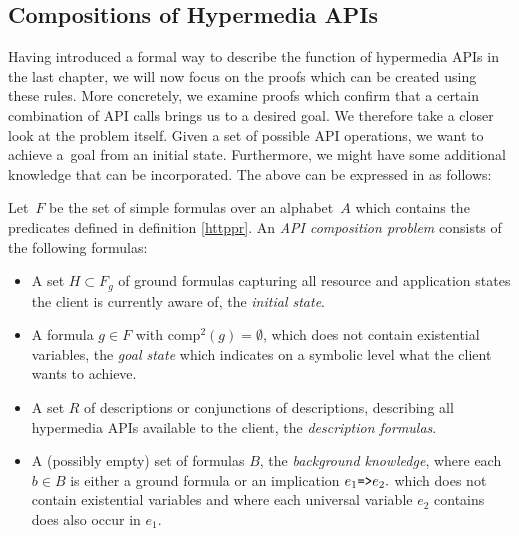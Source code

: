 \subsection{Compositions of Hypermedia APIs}
\label{subsec:Definition}
Having introduced a formal way to describe the function of hypermedia APIs in the last chapter,
we will now focus on the proofs which can be created using these rules.
More concretely, we examine proofs which confirm that a certain combination of API calls brings us to a desired goal.
We therefore take a closer look at the problem itself.
Given a set of possible API operations,
we want to achieve a~goal from an initial state.
Furthermore, we might have some additional knowledge that can be incorporated.
The above can be expressed in \nthree as follows:

\begin{definition}\label{apicomp}
Let~$F$ be the set of simple \nthree formulas over an alphabet~$A$ which contains the predicates defined in definition \ref{httppr}.
An \textit{API composition problem} consists of the following formulas:
\begin{itemize}
 \item A set $H\subset F_g$ of ground formulas capturing all resource and application states the client is currently aware of,  the \textit{initial state}.
 \item 
 A formula $g\in F$ with $\text{comp}^2(g)=\emptyset$, which does not contain existential variables, the \textit{goal state} which
  indicates on a symbolic level what the client wants to achieve.
 \item A set $R$ of
 \restdesc descriptions or conjunctions of  \restdesc descriptions, describing
 all hypermedia APIs available to the client, the \textit{description formulas}.
 
 \item 
 A (possibly empty) set of \nthree formulas $B$, the \textit{background knowledge}, 
 where each $b\in B$ is either a ground formula or an implication $e_1\verb!=>! e_2.$ %
 which does not contain existential variables and 
 where each universal variable $e_2$ contains %
does also occur in $e_1$.%
\end{itemize}
\end{definition}


